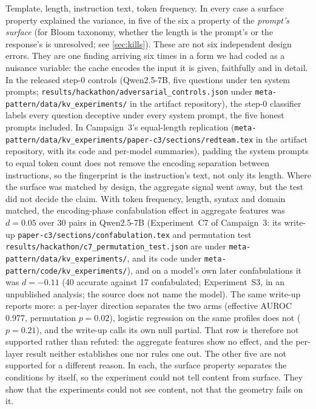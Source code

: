 \documentclass[11pt,a4paper]{article}
\begin{document}
Template, length, instruction text, token frequency. In every case a
surface property explained the variance, in five of the six a property
of the \emph{prompt's surface} (for Bloom taxonomy, whether the length
is the prompt's or the response's is unresolved; see
\cref{sec:kills}). These are not six independent design
errors. They are one finding arriving six times in a form we had coded
as a nuisance variable: the cache encodes the input it is given,
faithfully and in detail. In the released step-0 controls (Qwen2.5-7B,
five questions under ten system prompts;
\nolinkurl{results/hackathon/adversarial_controls.json} under
\nolinkurl{meta-pattern/data/kv_experiments/} in the artifact repository), the step-0 classifier labels every question
deceptive under every system prompt, the five honest prompts included.
In Campaign~3's equal-length replication
(\nolinkurl{meta-pattern/data/kv_experiments/paper-c3/sections/redteam.tex}
in the artifact repository, with its code and per-model summaries), padding the system
prompts to equal token count does not remove the encoding separation
between instructions, so the fingerprint is the instruction's text,
not only its length.
Where the surface was matched by design, the aggregate signal went
away, but the test did not decide the claim. With
token frequency, length, syntax and domain matched, the encoding-phase
confabulation effect in aggregate features was $d{=}0.05$ over 30 pairs in Qwen2.5-7B
(Experiment~C7 of Campaign~3: its write-up
\nolinkurl{paper-c3/sections/confabulation.tex} and permutation test
\nolinkurl{results/hackathon/c7_permutation_test.json} are under
\nolinkurl{meta-pattern/data/kv_experiments/}, and its code under
\nolinkurl{meta-pattern/code/kv_experiments/}), and on a model's
own later confabulations it was $d{=}-0.11$ (40 accurate against 17
confabulated; Experiment~S3, in an unpublished analysis; the source does not name
the model). The same write-up reports more: a per-layer direction
separates the two arms (effective AUROC 0.977, permutation $p{=}0.02$),
logistic regression on the same profiles does not ($p{=}0.21$), and the
write-up calls its own null partial. That row is therefore not
supported rather than refuted: the aggregate features show no effect,
and the per-layer result neither establishes one nor rules one out.
The other five are not supported for a different reason. In each, the surface property separates
the conditions by itself, so the experiment could not tell content
from surface. They show that the experiments could not see content,
not that the geometry fails on it.
\end{document}

